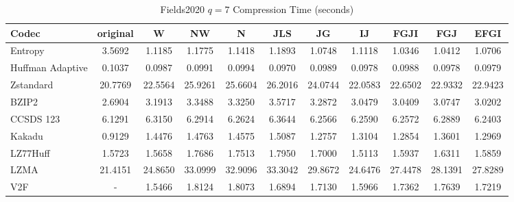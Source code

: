 \documentclass{article}
\begin{document}
\begin{table}[h!]
\centering
\caption{Fields2020 $q=7$ Compression Time (seconds)}
\begin{tabular}{|l|cccccccccc|}
\hline
Codec &  original &       W &      NW &       N &     JLS &      JG &      IJ &    FGJI &     FGJ &    EFGI \\
\hline
Entropy & 3.5692 & 1.1185 & 1.1775 & 1.1418 & 1.1893 & 1.0748 & 1.1118 & 1.0346 & 1.0412 & 1.0706         \\
\hline
Huffman Adaptive &    0.1037 &  0.0987 &  0.0991 &  0.0994 &  0.0970 &  0.0989 &  0.0978 &  0.0988 &  0.0978 &  0.0979 \\
Zstandard        &   20.7769 & 22.5564 & 25.9261 & 25.6604 & 26.2016 & 24.0744 & 22.0583 & 22.6502 & 22.9332 & 22.9423 \\
BZIP2            &    2.6904 &  3.1913 &  3.3488 &  3.3250 &  3.5717 &  3.2872 &  3.0479 &  3.0409 &  3.0747 &  3.0202 \\
CCSDS 123        &    6.1291 &  6.3150 &  6.2914 &  6.2624 &  6.3644 &  6.2566 &  6.2590 &  6.2572 &  6.2889 &  6.2403 \\
Kakadu           &    0.9129 &  1.4476 &  1.4763 &  1.4575 &  1.5087 &  1.2757 &  1.3104 &  1.2854 &  1.3601 &  1.2969 \\
LZ77Huff         &    1.5723 &  1.5658 &  1.7686 &  1.7513 &  1.7950 &  1.7000 &  1.5113 &  1.5937 &  1.6311 &  1.5859 \\
LZMA             &   21.4151 & 24.8650 & 33.0999 & 32.9096 & 33.3042 & 29.8672 & 24.6476 & 27.4478 & 28.1391 & 27.8289 \\
V2F              &    - &  1.5466 &  1.8124 &  1.8073 &  1.6894 &  1.7130 &  1.5966 &  1.7362 &  1.7639 &  1.7219 \\
\hline
\end{tabular}
\end{table}

\newpage
\end{document}
